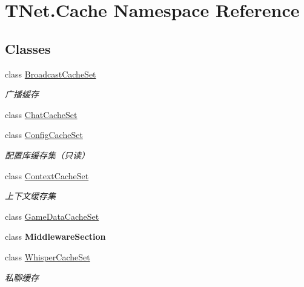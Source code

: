 \hypertarget{namespace_t_net_1_1_cache}{}\section{T\+Net.\+Cache Namespace Reference}
\label{namespace_t_net_1_1_cache}
\subsection*{Classes}
\begin{DoxyCompactItemize}
\item 
class \mbox{\hyperlink{class_t_net_1_1_cache_1_1_broadcast_cache_set}{Broadcast\+Cache\+Set}}
\begin{DoxyCompactList}\small\item\em 广播缓存 \end{DoxyCompactList}\item 
class \mbox{\hyperlink{class_t_net_1_1_cache_1_1_chat_cache_set}{Chat\+Cache\+Set}}
\item 
class \mbox{\hyperlink{class_t_net_1_1_cache_1_1_config_cache_set}{Config\+Cache\+Set}}
\begin{DoxyCompactList}\small\item\em 配置库缓存集（只读） \end{DoxyCompactList}\item 
class \mbox{\hyperlink{class_t_net_1_1_cache_1_1_context_cache_set}{Context\+Cache\+Set}}
\begin{DoxyCompactList}\small\item\em 上下文缓存集 \end{DoxyCompactList}\item 
class \mbox{\hyperlink{class_t_net_1_1_cache_1_1_game_data_cache_set}{Game\+Data\+Cache\+Set}}
\item 
class {\bfseries Middleware\+Section}
\item 
class \mbox{\hyperlink{class_t_net_1_1_cache_1_1_whisper_cache_set}{Whisper\+Cache\+Set}}
\begin{DoxyCompactList}\small\item\em 私聊缓存 \end{DoxyCompactList}\end{DoxyCompactItemize}
